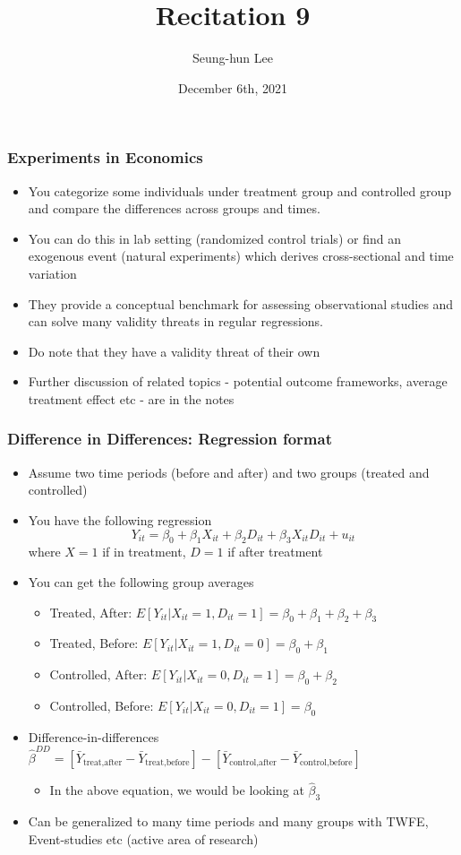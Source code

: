 \documentclass[aspectratio=169]{beamer}
\title[Recitation 9]{Recitation 9} %
\author[Seung-hun Lee]{Seung-hun Lee}
\institute[Columbia University]{Columbia University}
\date[December 6th, 2021]{December 6th, 2021}
\begin{document}
\begin{frame}
\titlepage
\end{frame}

\begin{frame}
\frametitle{Experiments in Economics}
\begin{itemize}
\item You categorize some individuals under treatment group and controlled group and compare the differences across groups and times. 
\item You can do this in lab setting (randomized control trials) or find an exogenous event (natural experiments) which derives cross-sectional and time variation
\item They provide a conceptual benchmark for assessing observational studies and can solve many validity threats in regular regressions.
\item Do note that they have a validity threat of their own
\item Further discussion of related topics - potential outcome frameworks, average treatment effect etc - are in the notes
\end{itemize}
\end{frame}


\begin{frame}
\frametitle{Difference in Differences: Regression format}
\begin{itemize}
\item Assume two time periods (before and after) and two groups (treated and controlled)
\item You have the following regression
\[
Y_{it} = \beta_0 + \beta_1 X_{it} + \beta_2 D_{it} + \beta_3 X_{it}D_{it}+u_{it}
\]
where $X=1$ if in treatment, $D=1$ if after treatment
\item You can get the following group averages
\begin{itemize}
\item Treated, After: $E[Y_{it}|X_{it}=1, D_{it}=1] = \beta_0+\beta_1 + \beta_2 + \beta_3$
\item Treated, Before: $E[Y_{it}|X_{it}=1, D_{it}=0] =\beta_0+ \beta_1 $ 
\item Controlled, After: $E[Y_{it}|X_{it}=0, D_{it}=1] =\beta_0+ \beta_2 $
\item Controlled, Before: $E[Y_{it}|X_{it}=0, D_{it}=1] =\beta_0 $ 
\end{itemize}
\item Difference-in-differences  $\hat{\beta}^{DD}=[\bar{Y}_{\text{treat,after}}-\bar{Y}_{\text{treat,before}}]-[\bar{Y}_{\text{control,after}}-\bar{Y}_{\text{control,before}}]$
\begin{itemize}
\item In the above equation, we would be looking at $\hat{\beta}_3$
\end{itemize}
\item Can be generalized to many time periods and many groups with TWFE, Event-studies etc (active area of research)
\end{itemize}
\end{frame}
\end{document}
